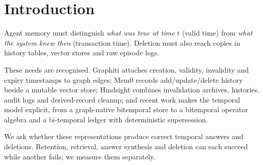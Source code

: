 \documentclass[conference]{IEEEtran}
\begin{document}
\section{Introduction}

Agent memory must distinguish \emph{what was true at time $t$} (valid time)
from \emph{what the system knew then} (transaction time). Deletion must also
reach copies in history tables, vector stores and raw episode logs.

These needs are recognised. Graphiti attaches creation, validity, invalidity and
expiry timestamps to graph edges; Mem0 records add/update/delete history beside
a mutable vector store; Hindsight combines invalidation archives, histories,
audit logs and derived-record cleanup; and recent work makes the temporal model
explicit, from a graph-native bitemporal store to a bitemporal operator algebra
and a bi-temporal ledger with deterministic supersession.

We ask whether these representations produce correct temporal answers and
deletions. Retention, retrieval, answer synthesis and deletion can each succeed
while another fails; we measure them separately.
\end{document}
